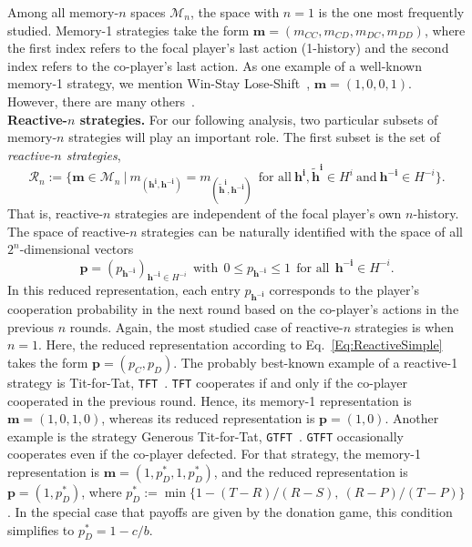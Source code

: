 \documentclass[11pt]{article}
\theoremstyle{plainCl1}
\theoremstyle{plainCl2}
\def\tft{\texttt{TFT}}
\def\gtft{\texttt{GTFT}}
\begin{document}
Among all memory-$n$ spaces $\mathcal{M}_n$, the space with $n\!=\!1$ is the one most frequently studied. 
Memory-1 strategies take the form $\mathbf{m}\!=\!(m_{CC}, m_{CD}, m_{DC}, m_{DD})$, where the first index refers to the focal player's last action (1-history) and the second index refers to the co-player's last action. 
As one example of a well-known memory-1 strategy, we mention Win-Stay Lose-Shift~\citep{nowak:Nature:1993}, $\mathbf{m}\!=\!(1,0,0,1)$. However, there are many others~\citep{hilbe:Nature:2018}.\\


\noindent
{\bfseries Reactive-$n$ strategies.} For our following analysis, two particular subsets of memory-$n$ strategies will play an important role. 
The first subset is the set of {\it reactive-$n$ strategies}, 
\begin{equation}
\mathcal{R}_n:=\Big\{ \mathbf{m}\!\in\!\mathcal{M}_n ~\Big|~ m_{(\mathbf{h^i},\mathbf{h^{-i}})}\!=\!m_{(\mathbf{\tilde{h}^i},\mathbf{h^{-i}})}~~\text{for all}~\mathbf{h^i}, \mathbf{\tilde{h}^i}\!\in\!H^i~\text{and}~\mathbf{h^{-i}}\!\in\!H^{-i}\Big\}.
\end{equation}
That is, reactive-$n$ strategies are independent of the focal player's own $n$-history. 
The space of \mbox{reactive-$n$} strategies can be naturally identified with the space of all $2^n$-dimensional vectors 
\begin{equation}\label{Eq:ReactiveSimple}
\mathbf{p}\!=\!(p_\mathbf{h^{-i}})_{\mathbf{h^{-i}}\in H^{-i}} ~~\text{with}~~ 0\!\le\!p_\mathbf{h^{-i}}\!\le\!1 ~~\text{for all}~~ \mathbf{h^{-i}}\!\in\! H^{-i}.
\end{equation}
In this reduced representation, each entry $p_{\mathbf{h^{-i}}}$ corresponds to the player's cooperation
probability in the next round based on the co-player's actions in the previous
$n$ rounds. 
Again, the most studied case of reactive-$n$ strategies is when $n\!=\!1$.
Here, the reduced representation according to Eq.~\eqref{Eq:ReactiveSimple} takes the form $\mathbf{p}\!=\!(p_C,p_D)$.
The probably best-known example of a reactive-1 strategy is Tit-for-Tat, \tft~\citep{axelrod:AAAS:1981}. 
\tft{} cooperates if and only if the co-player cooperated in the previous round. 
Hence, its memory-1 representation is $\mathbf{m}\!=\!(1,0,1,0)$, whereas its reduced representation is $\mathbf{p}\!=\!(1,0)$. 
Another example is the strategy Generous Tit-for-Tat, \gtft~\citep{nowak:Nature:1992,molander:jcr:1985}.
\gtft{} occasionally cooperates even if the co-player defected. 
For that strategy, the memory-1 representation is $\mathbf{m}\!=\!(1,p^*_D,1,p^*_D)$, and the reduced representation is $\mathbf{p}\!=\!(1,p^*_D)$, where $p^*_D\!:=\!\min\big\{1\!-\!(T\!-\!R)/(R\!-\!S),~(R\!-\!P)/(T\!-\!P)\big\}$. 
In the special case that payoffs are given by the donation game, this condition simplifies to $p^*_D\!=\!1-c/b$.\\
\end{document}
